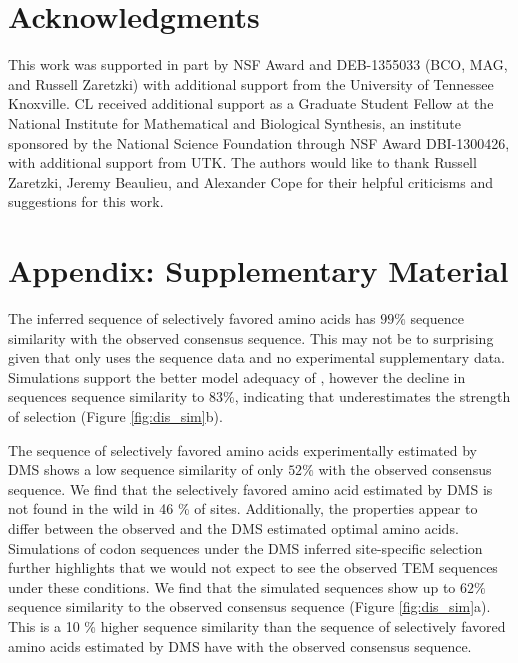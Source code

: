 \documentclass[fleqn,letterpaper]{article}
\newcommand\suppl{\par
  \setcounter{section}{0}%
  \setcounter{subsection}{0}%
  \setcounter{table}{0}%
  \setcounter{figure}{0}%
  \setcounter{equation}{0}%
  \gdef\thesection{\Alph{section}.1}%
  \def\thefigure{\Alph{section}\arabic{figure}}%
  \def\thetable{\Alph{section}\arabic{table}}%
  \def\theequation {\Alph{section}\arabic{equation}}}
\begin{document}
\section{Acknowledgments}
This work was supported in part by NSF Award and DEB-1355033 (BCO, MAG, and Russell Zaretzki) with additional support from the University of Tennessee Knoxville. 
CL received additional support as a Graduate Student Fellow at the National Institute for Mathematical and Biological Synthesis, an institute sponsored by the National Science Foundation through NSF Award DBI-1300426, with additional support from UTK. 
The authors would like to thank Russell Zaretzki, Jeremy Beaulieu, and Alexander Cope for their helpful criticisms and suggestions for this work.


 

\clearpage


\suppl
\setcounter{section}{18} %
\setcounter{page}{1}
\renewcommand{\thepage}{S\arabic{page}} %

\section{Appendix: Supplementary Material}

The \selac inferred sequence of selectively favored amino acids has $99 \%$ sequence similarity with the observed consensus sequence.
This may not be to surprising given that \selac only uses the sequence data and no experimental supplementary data.
Simulations support the better model adequacy of \selac, however the decline in sequences sequence similarity to $83 \%$, indicating that \selac underestimates the strength of selection (Figure \ref{fig:dis_sim}b).

The sequence of selectively favored amino acids experimentally estimated by DMS shows a low sequence similarity of only $52 \%$ with the observed consensus sequence. 
We find that the selectively favored amino acid estimated by DMS is not found in the wild in 46 \% of sites.
Additionally, the \PC properties appear to differ between the observed and the DMS estimated optimal amino acids.
Simulations of codon sequences under the DMS inferred site-specific selection further highlights that we would not expect to see the observed TEM sequences under these conditions.
We find that the simulated sequences show up to $62 \%$ sequence similarity to the observed consensus sequence (Figure \ref{fig:dis_sim}a).
This is a 10 \% higher sequence similarity than the sequence of selectively favored amino acids estimated by DMS have with the observed consensus sequence. 
\end{document}
